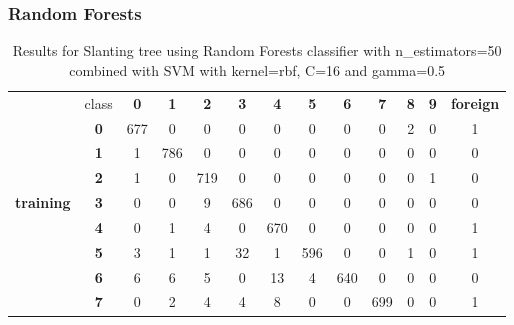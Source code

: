 \subsubsection{Random Forests}



\begin{table}[htp]
	\centering
	\caption{Results for Slanting tree using Random Forests classifier with n\_estimators=50 combined with SVM with kernel=rbf, C=16 and gamma=0.5}
	\label{slanting_tree2_rf_results}
	\begin{tabular}{|c|c|c|c|c|c|c|c|c|c|c|c|c|}
		\hline
		\multirow{11}{*}{\textbf{training}} & class      & \textbf{0} & \textbf{1} & \textbf{2} & \textbf{3} & \textbf{4} & \textbf{5} & \textbf{6} & \textbf{7} & \textbf{8} & \textbf{9} & \textbf{foreign} \\ \cline{2-13} 
		& \textbf{0} & 677        & 0          & 0          & 0          & 0          & 0          & 0          & 0          & 2          & 0          & 1                \\ \cline{2-13} 
		& \textbf{1} & 1          & 786        & 0          & 0          & 0          & 0          & 0          & 0          & 0          & 0          & 0                \\ \cline{2-13} 
		& \textbf{2} & 1          & 0          & 719        & 0          & 0          & 0          & 0          & 0          & 0          & 1          & 0                \\ \cline{2-13} 
		& \textbf{3} & 0          & 0          & 9          & 686        & 0          & 0          & 0          & 0          & 0          & 0          & 0                \\ \cline{2-13} 
		& \textbf{4} & 0          & 1          & 4          & 0          & 670        & 0          & 0          & 0          & 0          & 0          & 1                \\ \cline{2-13} 
		& \textbf{5} & 3          & 1          & 1          & 32         & 1          & 596        & 0          & 0          & 1          & 0          & 1                \\ \cline{2-13} 
		& \textbf{6} & 6          & 6          & 5          & 0          & 13         & 4          & 640        & 0          & 0          & 0          & 0                \\ \cline{2-13} 
		& \textbf{7} & 0          & 2          & 4          & 4          & 8          & 0          & 0          & 699        & 0          & 0          & 1                \\ \cline{2-13} 

\end{tabular}
\end{table}
